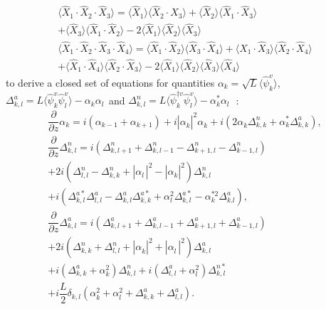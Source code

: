 \documentclass{osa-article}
\begin{document}
\begin{equation}
	\begin{array}{r}
		\langle \hat{X}_1\!\cdot\!\hat{X}_2\!\cdot\!\hat{X}_3\rangle = \langle\hat{X}_1\rangle\langle\hat{X}_2\!\cdot\!\hat{X}_3\rangle + \langle\hat{X}_2\rangle\langle\hat{X}_1\!\cdot\!\hat{X}_3\rangle  \,\,\,\,\,\,\,\,\,\,\,\,\,\,\,\,\,\,\,\,\,\,\,\,\,\\+ \langle\hat{X}_3\rangle\langle\hat{X}_1\!\cdot\!\hat{X}_2\rangle - 2\langle\hat{X}_1\rangle \langle\hat{X}_2\rangle\langle\hat{X}_3\rangle \\
		\langle \hat{X}_1\!\cdot\!\hat{X}_2\!\cdot\!\hat{X}_3\!\cdot\!\hat{X}_4\rangle \!=\! \langle\hat{X}_1\!\cdot\!\hat{X}_2\rangle\langle\hat{X}_3\!\cdot\!\hat{X}_4\rangle \!+\!  \langle\hat{X}_1\!\cdot\!\hat{X}_3\rangle\langle\hat{X}_2\!\cdot\!\hat{X}_4\rangle \\+ \langle\hat{X}_1\!\cdot\!\hat{X}_4\rangle\langle\hat{X}_2\!\cdot\!\hat{X}_3\rangle - 2\langle\hat{X}_1\rangle \langle\hat{X}_2\rangle\langle\hat{X}_3\rangle\langle\hat{X}_4\rangle
	\end{array}
\end{equation}
to derive a closed set of equations for quantities $\alpha_k = \sqrt{L} \langle\hat{\psi}^{v}_{k}\rangle$, $\Delta^{a}_{k,l} = L \langle\hat{\psi}^{v}_{k}\hat{\psi}^{v}_{l}\rangle - \alpha^{\phantom{*}}_k\alpha^{\phantom{*}}_l$ and $\Delta^{n}_{k,l} = L \langle\hat{\psi}^{\dag v}_{k}\hat{\psi}^{v}_{l}\rangle - \alpha^{*}_k\alpha^{\phantom{*}}_l$~\cite{tikhonenkov_quantum_2007}: 
\begin{equation}\label{eq:second_order}
	\begin{array}{c}
		\dfrac{\partial}{\partial z}\alpha_{k}\! =\! i\left(\alpha_{k-1}\! +\! \alpha_{k+1} \right) \!+\! i\left|\alpha^{\phantom{*}}_{k}\!\right|^{2}\alpha^{\phantom{*}}_{k} \!\!+\! i\left(2\alpha^{\phantom{*}}_{k}\Delta^{n}_{k,k} \!+\! \alpha^{*}_{k}\Delta^{a}_{k,k}\right),\\
		\dfrac{\partial}{\partial z}\Delta^{n}_{k,l} = i\left(\Delta^{n}_{k,l+1} + \Delta^{n}_{k,l-1} - \Delta^{n}_{k+1,l} - \Delta^{n}_{k-1,l}\right) \\+ 2i\left(\Delta^{n}_{l,l} - \Delta^{n}_{k,k} + \left|\alpha^{\phantom{*}}_{l}\!\right|^{2} -\left|\alpha^{\phantom{*}}_{k}\right|^{2}\right)\Delta^{n}_{k,l}  \\
		+ i\left(\Delta^{a*}_{k,l}\Delta^{a}_{l,l} - \Delta^{a}_{k,l}\Delta^{a*}_{k,k} + \alpha^{2}_{l}\Delta^{a*}_{k,l} - \alpha^{*2}_{k}\Delta^{a}_{k.l}\right), \\
		\dfrac{\partial}{\partial z}\Delta^{a}_{k,l} = i\left(\Delta^{a}_{k,l+1} + \Delta^{a}_{k,l-1} + \Delta^{a}_{k+1,l} + \Delta^{a}_{k-1,l}\right)  \\+ 2i\left(\Delta^{n}_{k,k} + \Delta^{n}_{l,l} + \left|\alpha^{\phantom{*}}_{k}\right|^{2} + \left|\alpha^{\phantom{*}}_{l}\!\right|^{2}\right)\Delta^{a}_{k,l}  \\
		+ i\left(\Delta^{a}_{k,k} + \alpha^{2}_{k}\right)\Delta^{n}_{k,l} + i\left(\Delta^{a}_{l,l} + \alpha^{2}_{l}\right)\Delta^{n*}_{k,l} \\+ i\dfrac{L}{2}\delta_{k,l}\left(\alpha^{2}_{k} + \alpha^{2}_{l} + \Delta^{a}_{k,k} + \Delta^{a}_{l,l}\right).
	\end{array}
\end{equation}
\end{document}
